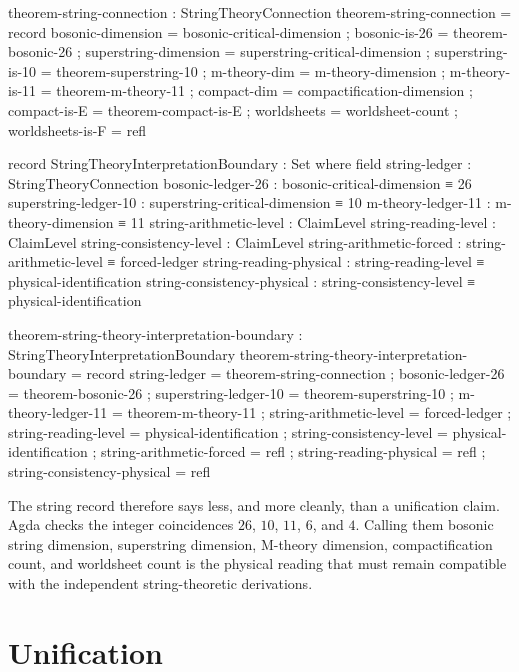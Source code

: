 \documentclass[11pt,a4paper]{book}
\begin{document}
\begin{code}
theorem-string-connection : StringTheoryConnection
theorem-string-connection = record
  { bosonic-dimension     = bosonic-critical-dimension
  ; bosonic-is-26         = theorem-bosonic-26
  ; superstring-dimension = superstring-critical-dimension
  ; superstring-is-10     = theorem-superstring-10
  ; m-theory-dim          = m-theory-dimension
  ; m-theory-is-11        = theorem-m-theory-11
  ; compact-dim           = compactification-dimension
  ; compact-is-E          = theorem-compact-is-E
  ; worldsheets           = worldsheet-count
  ; worldsheets-is-F      = refl }

record StringTheoryInterpretationBoundary : Set where
  field
    string-ledger              : StringTheoryConnection
    bosonic-ledger-26          : bosonic-critical-dimension ≡ 26
    superstring-ledger-10      : superstring-critical-dimension ≡ 10
    m-theory-ledger-11         : m-theory-dimension ≡ 11
    string-arithmetic-level    : ClaimLevel
    string-reading-level       : ClaimLevel
    string-consistency-level   : ClaimLevel
    string-arithmetic-forced   : string-arithmetic-level ≡ forced-ledger
    string-reading-physical    : string-reading-level ≡ physical-identification
    string-consistency-physical : string-consistency-level ≡ physical-identification

theorem-string-theory-interpretation-boundary : StringTheoryInterpretationBoundary
theorem-string-theory-interpretation-boundary = record
  { string-ledger               = theorem-string-connection
  ; bosonic-ledger-26           = theorem-bosonic-26
  ; superstring-ledger-10       = theorem-superstring-10
  ; m-theory-ledger-11          = theorem-m-theory-11
  ; string-arithmetic-level     = forced-ledger
  ; string-reading-level        = physical-identification
  ; string-consistency-level    = physical-identification
  ; string-arithmetic-forced    = refl
  ; string-reading-physical     = refl
  ; string-consistency-physical = refl }
\end{code}

The string record therefore says less, and more cleanly, than a unification
claim.  Agda checks the integer coincidences $26$, $10$, $11$, $6$, and $4$.
Calling them bosonic string dimension, superstring dimension, M-theory
dimension, compactification count, and worldsheet count is the physical reading
that must remain compatible with the independent string-theoretic derivations.

\chapter{Unification}
\label{ch:unification}
\end{document}
